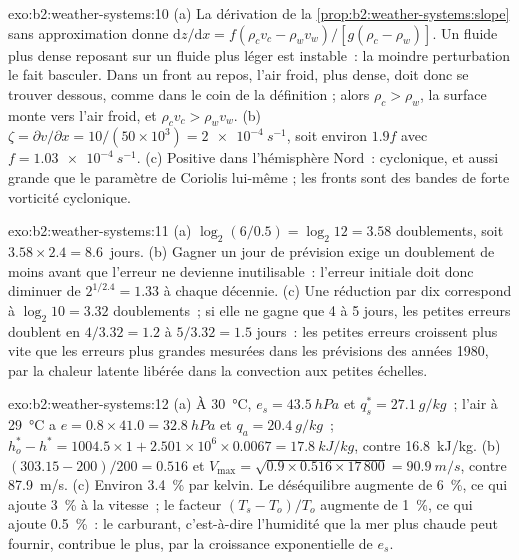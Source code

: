 \begin{solution}{exo:b2:weather-systems:10}
(a) La dérivation de la \cref{prop:b2:weather-systems:slope} sans approximation donne
$\mathrm{d}z/\mathrm{d}x = f(\rho_c v_c - \rho_w v_w)/[g(\rho_c - \rho_w)]$. Un fluide plus dense
reposant sur un fluide plus léger est instable~: la moindre perturbation le fait basculer. Dans un front au
repos, l'air froid, plus dense, doit donc se trouver dessous, comme dans le coin de la définition ; alors
$\rho_c > \rho_w$, la surface monte vers l'air froid, et $\rho_c v_c > \rho_w v_w$.
(b) $\zeta = \partial v/\partial x = 10/(50 \times 10^3) = \qty{2e-4}{s^{-1}}$, soit environ $1.9f$ avec
$f = \qty{1.03e-4}{s^{-1}}$. (c) Positive dans l'hémisphère Nord~: cyclonique, et aussi grande que
le paramètre de Coriolis lui-même ; les fronts sont des bandes de forte vorticité cyclonique.
\end{solution}

\begin{solution}{exo:b2:weather-systems:11}
(a) $\log_2(6/0.5) = \log_2 12 = 3.58$ doublements, soit $3.58 \times 2.4 = 8.6$~jours. (b) Gagner un jour de prévision
exige un doublement de moins avant que l'erreur ne devienne inutilisable~: l'erreur initiale doit donc diminuer de
$2^{1/2.4} = 1.33$ à chaque décennie. (c) Une réduction par dix correspond à
$\log_2 10 = 3.32$ doublements~; si elle ne gagne que 4 à 5 jours, les petites erreurs doublent en $4/3.32 = 1.2$
à $5/3.32 = 1.5$ jours~: les petites erreurs croissent plus vite que les erreurs plus grandes mesurées dans les
prévisions des années 1980, par la chaleur latente libérée dans la convection aux petites échelles.
\end{solution}

\begin{solution}{exo:b2:weather-systems:12}
(a) À \qty{30}{\celsius}, $e_s = \qty{43.5}{hPa}$ et $q_s^* = \qty{27.1}{g/kg}$~; l'air à
\qty{29}{\celsius} a $e = 0.8 \times 41.0 = \qty{32.8}{hPa}$ et $q_a = \qty{20.4}{g/kg}$~;
$h_o^* - h^* = 1004.5 \times 1 + 2.501 \times 10^6 \times 0.0067 = \qty{17.8}{kJ/kg}$, contre
\qty{16.8}{kJ/kg}. (b) $(303.15 - 200)/200 = 0.516$ et $V_{\max} = \sqrt{0.9 \times 0.516
\times 17\,800} = \qty{90.9}{m/s}$, contre \qty{87.9}{m/s}. (c) Environ \qty{3.4}{\percent} par
kelvin. Le déséquilibre augmente de \qty{6}{\percent}, ce qui ajoute \qty{3}{\percent} à la vitesse~;
le facteur $(T_s - T_o)/T_o$ augmente de \qty{1}{\percent}, ce qui ajoute \qty{0.5}{\percent}~: le
carburant, c'est-à-dire l'humidité que la mer plus chaude peut fournir, contribue le plus, par la croissance exponentielle de
$e_s$.
\end{solution}

